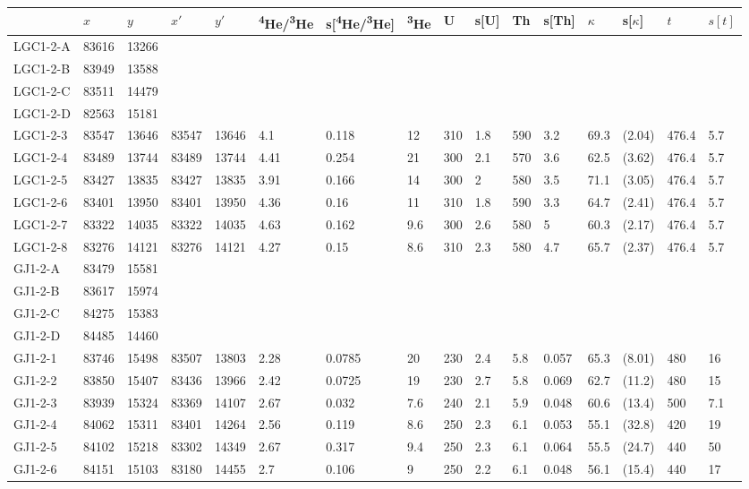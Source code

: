 \addtolength\tabcolsep{-0.05em}
\begin{longtable*}{@{}l@{~~}l@{~~}l@{~~}l@{~~}l@{~~}l@{~~}l@{~~}l@{~~}l@{~~}l@{~~}l@{~~}l@{~~}l@{~~}l@{~~}l@{~~}l@{}}
&$x$&$y$&$x'$&$y'$&\textsuperscript{4}He/\textsuperscript{3}He&s[\textsuperscript{4}He/\textsuperscript{3}He]&\textsuperscript{3}He&U&s[U]&Th&s[Th]&$\kappa$&s[$\kappa$]&$t$&$s[t]$\\ \hline
\endhead
LGC1-2-A&83616&13266&&&&&&&&&&&&&\\
LGC1-2-B&83949&13588&&&&&&&&&&&&&\\
LGC1-2-C&83511&14479&&&&&&&&&&&&&\\
LGC1-2-D&82563&15181&&&&&&&&&&&&&\\
LGC1-2-3&83547&13646&83547&13646&4.1&0.118&12&310&1.8&590&3.2&69.3&(2.04)&476.4&5.7\\
LGC1-2-4&83489&13744&83489&13744&4.41&0.254&21&300&2.1&570&3.6&62.5&(3.62)&476.4&5.7\\
LGC1-2-5&83427&13835&83427&13835&3.91&0.166&14&300&2&580&3.5&71.1&(3.05)&476.4&5.7\\
LGC1-2-6&83401&13950&83401&13950&4.36&0.16&11&310&1.8&590&3.3&64.7&(2.41)&476.4&5.7\\
LGC1-2-7&83322&14035&83322&14035&4.63&0.162&9.6&300&2.6&580&5&60.3&(2.17)&476.4&5.7\\
LGC1-2-8&83276&14121&83276&14121&4.27&0.15&8.6&310&2.3&580&4.7&65.7&(2.37)&476.4&5.7\\
GJ1-2-A&83479&15581&&&&&&&&&&&&&\\
GJ1-2-B&83617&15974&&&&&&&&&&&&&\\
GJ1-2-C&84275&15383&&&&&&&&&&&&&\\
GJ1-2-D&84485&14460&&&&&&&&&&&&&\\
GJ1-2-1&83746&15498&83507&13803&2.28&0.0785&20&230&2.4&5.8&0.057&65.3&(8.01)&480&16\\
GJ1-2-2&83850&15407&83436&13966&2.42&0.0725&19&230&2.7&5.8&0.069&62.7&(11.2)&480&15\\
GJ1-2-3&83939&15324&83369&14107&2.67&0.032&7.6&240&2.1&5.9&0.048&60.6&(13.4)&500&7.1\\
GJ1-2-4&84062&15311&83401&14264&2.56&0.119&8.6&250&2.3&6.1&0.053&55.1&(32.8)&420&19\\
GJ1-2-5&84102&15218&83302&14349&2.67&0.317&9.4&250&2.3&6.1&0.064&55.5&(24.7)&440&50\\
GJ1-2-6&84151&15103&83180&14455&2.7&0.106&9&250&2.2&6.1&0.048&56.1&(15.4)&440&17\\
\end{longtable*}
\addtolength\tabcolsep{+0.05em}
